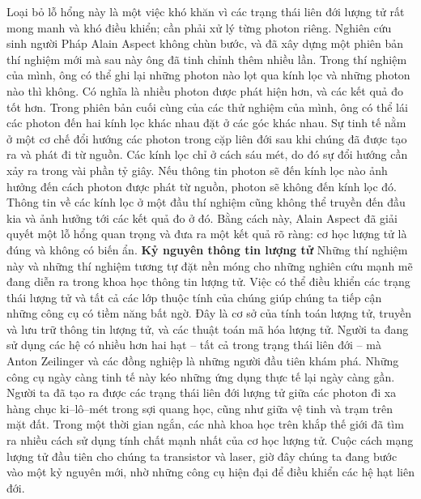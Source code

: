 \begin{multicols}{2}
	Loại bỏ lỗ hổng này là một việc khó khăn vì các trạng thái liên đới lượng tử rất mong manh và khó điều khiển; cần phải xử lý từng photon riêng. Nghiên cứu sinh người Pháp Alain Aspect không chùn bước, và đã xây dựng một phiên bản thí nghiệm mới mà sau này ông đã tinh chỉnh thêm nhiều lần. Trong thí nghiệm của mình, ông có thể ghi lại những photon nào lọt qua kính lọc và những photon nào thì không. Có nghĩa là nhiều photon được phát hiện hơn, và các kết quả đo tốt hơn.
	\vskip 0.1cm
	Trong phiên bản cuối cùng của các thử nghiệm của mình, ông có thể lái các photon đến hai kính lọc khác nhau đặt ở các góc khác nhau. Sự tinh tế nằm ở một cơ chế đổi hướng các photon trong cặp liên đới sau khi chúng đã được tạo ra và phát đi từ nguồn. Các kính lọc chỉ ở cách sáu mét, do đó sự đổi hướng cần xảy ra trong vài phần tỷ giây. Nếu thông tin photon sẽ đến kính lọc nào ảnh hưởng đến cách photon được phát từ nguồn, photon sẽ không đến kính lọc đó. Thông tin về các kính lọc ở một đầu thí nghiệm cũng không thể truyền đến đầu kia và ảnh hưởng tới các kết quả đo ở đó.
	\vskip 0.1cm
	Bằng cách này, Alain Aspect đã giải quyết một lỗ hổng quan trọng và đưa ra một kết quả rõ ràng: cơ học lượng tử là đúng và không có biến ẩn.
	\vskip 0.1cm
	\textbf{\color{timhieukhoahoc}Kỷ nguyên thông tin lượng tử}
	\vskip 0.1cm
	Những thí nghiệm này và những thí nghiệm tương tự đặt nền móng cho những nghiên cứu mạnh mẽ đang diễn ra trong khoa học thông tin lượng tử.
	\vskip 0.1cm
	Việc có thể điều khiển các trạng thái lượng tử và tất cả các lớp thuộc tính của chúng giúp chúng ta tiếp cận những công cụ có tiềm năng bất ngờ. Đây là cơ sở của tính toán lượng tử, truyền và lưu trữ thông tin lượng tử, và các thuật toán mã hóa lượng tử. Người ta đang sử dụng các hệ có nhiều hơn hai hạt -- tất cả trong trạng thái liên đới -- mà Anton Zeilinger và các đồng nghiệp là những người đầu tiên khám phá.
	\vskip 0.1cm
	Những công cụ ngày càng tinh tế này kéo những ứng dụng thực tế lại ngày càng gần. Người ta đã tạo ra được các trạng thái liên đới lượng tử giữa các photon đi xa hàng chục ki--lô--mét trong sợi quang học, cũng như giữa vệ tinh và trạm trên mặt đất. Trong một thời gian ngắn, các nhà khoa học trên khắp thế giới đã tìm ra nhiều cách sử dụng tính chất mạnh nhất của cơ học lượng tử.
	\vskip 0.1cm
	Cuộc cách mạng lượng tử đầu tiên cho chúng ta transistor và laser, giờ đây chúng ta đang bước vào một kỷ nguyên mới, nhờ những công cụ hiện đại để điều khiển các hệ hạt liên đới.
	\vskip 0.1cm
	\begin{figure}[H]
		\vspace*{-5pt}

\end{figure}
\end{multicols}
